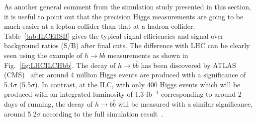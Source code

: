
As another general comment from the simulation study presented in this section, 
it is useful to point out that the precision Higgs measurements 
are going to be much easier at a lepton collider than that at a hadron collider.
Table~\ref{tab:ILCEffSB} gives the typical signal efficiencies and signal over
background ratios (S/B) after final cuts. The difference with
LHC can be clearly seen using the example of $h\to b\bar{b}$ measurements
as shown in Fig.~\ref{fig:LHCILCHbb}. The decay of $h\to b\bar{b}$
has been discovered by ATLAS (CMS)~\cite{Aaboud:2018zhk,Sirunyan:2018kst} 
after around 4 million Higgs events are produced
with a significance of 5.4$\sigma$ (5.5$\sigma$). In contrast, at the ILC, 
with only 400 Higgs events which will be produced with an integrated luminosity of 1.3 fb$^{-1}$
corresponding to around 2 days of running, the decay of $h\to b\bar{b}$ will be 
measured with a similar significance, around 5.2$\sigma$ according to the full 
simulation result~\cite{Ogawa:2018}.


